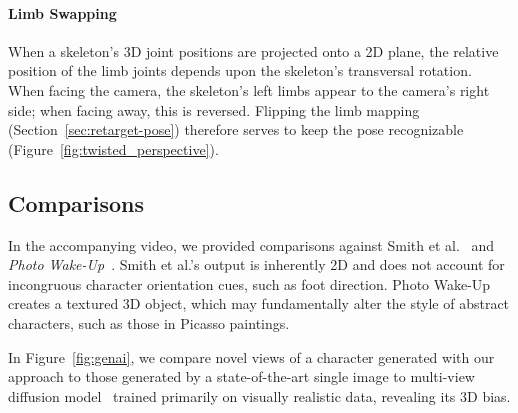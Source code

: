 \paragraph{Limb Swapping}
When a skeleton's 3D joint positions are projected onto a 2D plane, the relative position of the limb joints depends upon the skeleton's transversal rotation. 
When facing the camera, the skeleton's left limbs appear to the camera's right side; when facing away, this is reversed. 
Flipping the limb mapping (Section~\ref{sec:retarget-pose}) therefore serves to keep the pose recognizable (Figure~\ref{fig:twisted_perspective}).



\begin{comment}
    
Rotating the character to always face the viewer can result in unforeseen effects as the orientation of the input pose changes.
Consider character retargeted to display a T-pose facing directly towards the camera.
In this configuration, the pose's left arm drives the character's 'drawing right' arm. 
Now consider if we were to rotate the pose by $\pi$, such that it now faces away from us. If the pose's left arm were to continue driving the same arm upon the character, it would now go across the body.

This is because the left arm, as we rotate the pose, eventually lies to the right of the right arm after projection.
\end{comment}


\subsection{Comparisons}
In the accompanying video, we provided comparisons against Smith et al.~\cite{SmithHodgins} and \textit{Photo Wake-Up}~\cite{weng2019photo}.
Smith et al.'s output is inherently 2D and does not account for incongruous character orientation cues, such as foot direction. 
Photo Wake-Up creates a textured 3D object, which may fundamentally alter the style of abstract characters, such as those in Picasso paintings.

In Figure~\ref{fig:genai}, we compare novel views of a character generated with our approach to those generated by a state-of-the-art single image to multi-view diffusion model~\cite{shi2023zero123} trained primarily on visually realistic data, revealing its 3D bias.



